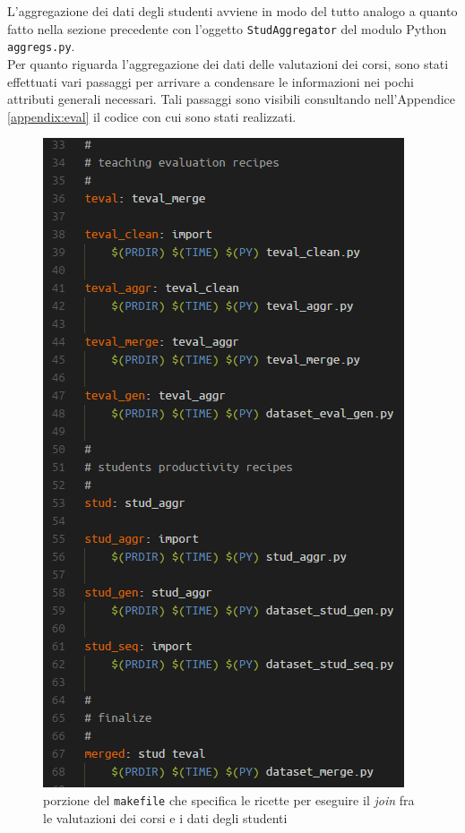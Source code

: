 		L'aggregazione dei dati degli studenti avviene in modo del tutto analogo a quanto fatto nella sezione precedente con l'oggetto \texttt{StudAggregator} del modulo Python \texttt{aggregs.py}. \\

		Per quanto riguarda l'aggregazione dei dati delle valutazioni dei corsi, sono stati effettuati vari passaggi per arrivare a condensare le informazioni nei pochi attributi generali necessari. Tali passaggi sono visibili consultando nell'Appendice \ref{appendix:eval} il codice con cui sono stati realizzati. \\

		\begin{figure}
			\centering
			\caption{porzione del \texttt{makefile} che specifica le ricette per eseguire il \textit{join} fra le valutazioni dei corsi e i dati degli studenti}
			\label{make_join}
			\includegraphics[scale=0.80]{img/make_join.png}
		\end{figure}

